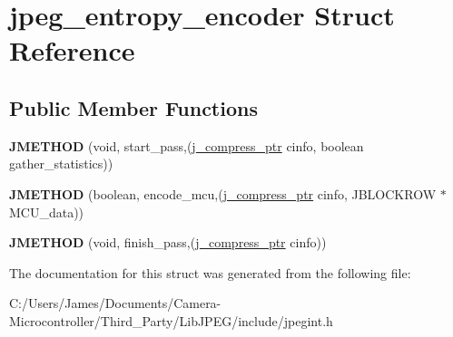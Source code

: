 \hypertarget{structjpeg__entropy__encoder}{}\section{jpeg\+\_\+entropy\+\_\+encoder Struct Reference}
\label{structjpeg__entropy__encoder}
\subsection*{Public Member Functions}
\begin{DoxyCompactItemize}
\item 
\mbox{\label{structjpeg__entropy__encoder_ae6aae6cdcc81e2d253c9a437df091a59}} 
{\bfseries J\+M\+E\+T\+H\+OD} (void, start\+\_\+pass,(\hyperlink{structjpeg__compress__struct}{j\+\_\+compress\+\_\+ptr} cinfo, boolean gather\+\_\+statistics))
\item 
\mbox{\label{structjpeg__entropy__encoder_a8ed0de3ae8e0595df24e98088a42383b}} 
{\bfseries J\+M\+E\+T\+H\+OD} (boolean, encode\+\_\+mcu,(\hyperlink{structjpeg__compress__struct}{j\+\_\+compress\+\_\+ptr} cinfo, J\+B\+L\+O\+C\+K\+R\+OW $\ast$M\+C\+U\+\_\+data))
\item 
\mbox{\label{structjpeg__entropy__encoder_a4fc42934ec96f826aeeab057d3192a83}} 
{\bfseries J\+M\+E\+T\+H\+OD} (void, finish\+\_\+pass,(\hyperlink{structjpeg__compress__struct}{j\+\_\+compress\+\_\+ptr} cinfo))
\end{DoxyCompactItemize}


The documentation for this struct was generated from the following file\+:\begin{DoxyCompactItemize}
\item 
C\+:/\+Users/\+James/\+Documents/\+Camera-\/\+Microcontroller/\+Third\+\_\+\+Party/\+Lib\+J\+P\+E\+G/include/jpegint.\+h\end{DoxyCompactItemize}
